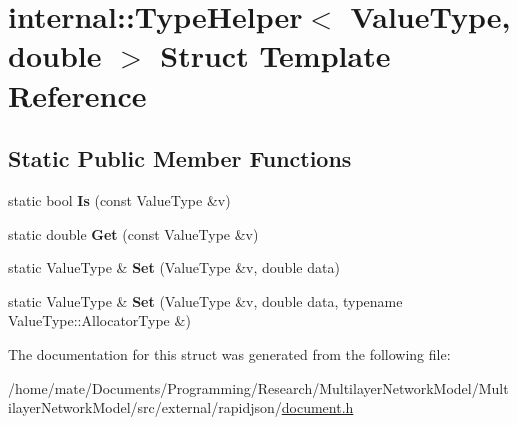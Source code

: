 \hypertarget{structinternal_1_1TypeHelper_3_01ValueType_00_01double_01_4}{}\section{internal\+:\+:Type\+Helper$<$ Value\+Type, double $>$ Struct Template Reference}
\label{structinternal_1_1TypeHelper_3_01ValueType_00_01double_01_4}
\subsection*{Static Public Member Functions}
\begin{DoxyCompactItemize}
\item 
static bool {\bfseries Is} (const Value\+Type \&v)\hypertarget{structinternal_1_1TypeHelper_3_01ValueType_00_01double_01_4_a6c265a3202beb9bd85ecc7896a8ab9dd}{}\label{structinternal_1_1TypeHelper_3_01ValueType_00_01double_01_4_a6c265a3202beb9bd85ecc7896a8ab9dd}

\item 
static double {\bfseries Get} (const Value\+Type \&v)\hypertarget{structinternal_1_1TypeHelper_3_01ValueType_00_01double_01_4_ac55a96d2abd1dd6718a6cb3d6690aa38}{}\label{structinternal_1_1TypeHelper_3_01ValueType_00_01double_01_4_ac55a96d2abd1dd6718a6cb3d6690aa38}

\item 
static Value\+Type \& {\bfseries Set} (Value\+Type \&v, double data)\hypertarget{structinternal_1_1TypeHelper_3_01ValueType_00_01double_01_4_a2b332dd6083278283289e107caff879b}{}\label{structinternal_1_1TypeHelper_3_01ValueType_00_01double_01_4_a2b332dd6083278283289e107caff879b}

\item 
static Value\+Type \& {\bfseries Set} (Value\+Type \&v, double data, typename Value\+Type\+::\+Allocator\+Type \&)\hypertarget{structinternal_1_1TypeHelper_3_01ValueType_00_01double_01_4_a69f7d942a569f3acdeb64127b2ecd9eb}{}\label{structinternal_1_1TypeHelper_3_01ValueType_00_01double_01_4_a69f7d942a569f3acdeb64127b2ecd9eb}

\end{DoxyCompactItemize}


The documentation for this struct was generated from the following file\+:\begin{DoxyCompactItemize}
\item 
/home/mate/\+Documents/\+Programming/\+Research/\+Multilayer\+Network\+Model/\+Multilayer\+Network\+Model/src/external/rapidjson/\hyperlink{document_8h}{document.\+h}\end{DoxyCompactItemize}
